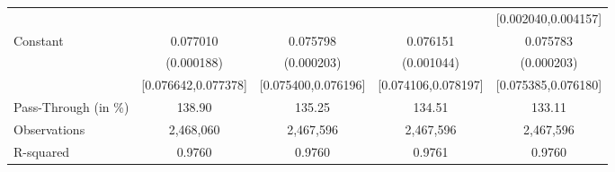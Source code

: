 {\begin{tabular}{l*{4}{c}}
                    &                     &                     &                     &[0.002040,0.004157]         \\
Constant            &    0.077010\sym{***}&    0.075798\sym{***}&    0.076151\sym{***}&    0.075783\sym{***}\\
                    &  (0.000188)         &  (0.000203)         &  (0.001044)         &  (0.000203)         \\
                    &[0.076642,0.077378]         &[0.075400,0.076196]         &[0.074106,0.078197]         &[0.075385,0.076180]         \\
\midrule
Pass-Through (in \%)&      138.90         &      135.25         &      134.51         &      133.11         \\
Observations        &   2,468,060         &   2,467,596         &   2,467,596         &   2,467,596         \\
R-squared           &      0.9760         &      0.9760         &      0.9761         &      0.9760         \\
\bottomrule
\end{tabular}
}
